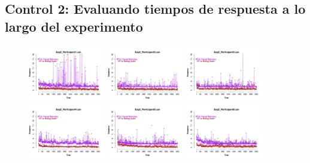




\subsection{Control 2: Evaluando tiempos de respuesta a lo largo del experimento}




\begin{figure}[th]
\centering
\includegraphics[width=0.30\textwidth]{Figures/RTs_Exp2_P1} \includegraphics[width=0.30\textwidth]{Figures/RTs_Exp2_P2} \includegraphics[width=0.30\textwidth]{Figures/RTs_Exp2_P3}
\includegraphics[width=0.30\textwidth]{Figures/RTs_Exp2_P4} \includegraphics[width=0.30\textwidth]{Figures/RTs_Exp2_P5} \includegraphics[width=0.30\textwidth]{Figures/RTs_Exp2_P6}

\end{figure}
